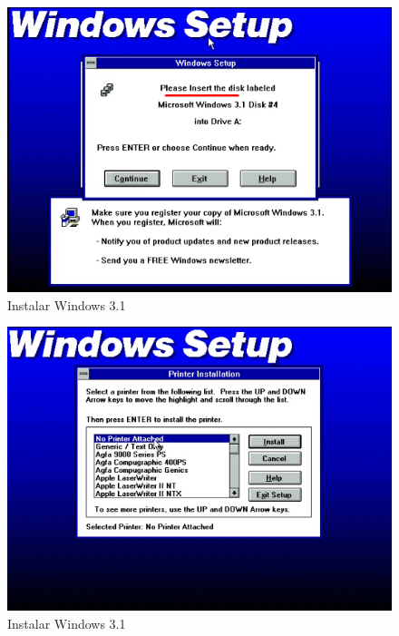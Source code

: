 \documentclass{report}
\begin{document}
\begin{figure}
\centering
\includegraphics[width=\textwidth]{Screenshot_32.png}
\caption{Instalar Windows 3.1}
\label{fig:32}
\end{figure}

\begin{figure}
\centering
\includegraphics[width=\textwidth]{Screenshot_33.png}
\caption{Instalar Windows 3.1}
\label{fig:33}
\end{figure}
\end{document}
